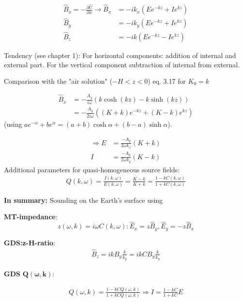 \begin{align*}
\hat{B}_x=-\frac{\partial \hat{U}}{\partial x}\rightarrow \hat{B}_x&=-ik_x(Ee^{-kz}+Ie^{kz})\\
\hat{B}_y&=-ik_y(Ee^{-kz}+Ie^{kz})\\
\hat{B}_z&=-ik(Ee^{-kz}-Ie^{kz})
\end{align*}

Tendency (see chapter 1): For horizontal components: addition of internal and external part. For the vertical component subtraction of internal from external.


Comparison with the "air solution" ($-H<z<0$) eq. 3.17 for $K_0=k$

\begin{align*}
\hat{B}_x&=-\frac{A_y}{i\omega}(k\cosh(kz)-k\sinh(kz))\\
&=-\frac{A_y}{2i\omega}((K+k)e^{-kz}+(K-k)e^{kz})
\end{align*}
(using $ae^{-\alpha}+be^\alpha=(a+b)\cosh\alpha+(b-a)\sinh\alpha$).

\begin{align}
\Rightarrow E&=\frac{-A_y}{2\omega k_x}(K+k)\\
I&=\frac{-A_y}{2\omega k_y}(K-k)
\end{align}
Additional parameters for quasi-homogeneous source fields:
\begin{align}
Q(k,\omega)=\frac{I(k,\omega)}{E(k,\omega)}=\frac{K-k}{K+k}=\frac{1-kC(k,\omega)}{1+kC(k,\omega)}
\end{align}

\textbf{In summary:} Sounding on the Earth's surface using 

\textbf{MT-impedance}:
\begin{equation*}
z(\omega,k)=i\omega C(k,\omega):\hat{E}_x=z\hat{B}_y, \hat{E}_y=-z\hat{B}_x
\end{equation*}

\textbf{GDS:z-H-ratio}:
\begin{align*}
\hat{B}_z=ikB_y\frac{k}{k_y}=ikCB_y\frac{k}{k_y}
\end{align*}

\textbf{GDS} $\mathbf{ Q(\omega,k)}$:

\begin{align*}
Q(\omega,k)=\frac{1-kCQ(\omega,k)}{1+kCQ(\omega,k)}\Rightarrow I=\frac{1-kC}{1+kC}E
\end{align*}

